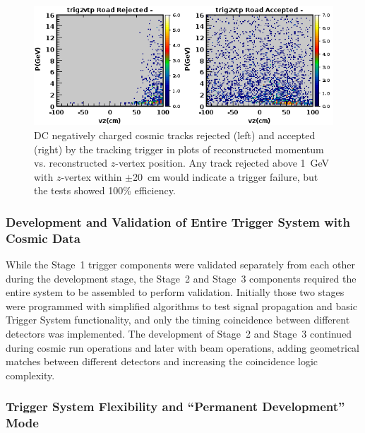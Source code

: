 \begin{figure}[!htb]
 	\centering
  	\includegraphics[width=1.0\columnwidth,keepaspectratio]{img/dc_cosmic_efficiency.png}
 	\caption{DC negatively charged cosmic tracks rejected (left) and accepted (right) by the tracking trigger
          in plots of reconstructed momentum vs. reconstructed $z$-vertex position. Any track rejected above
          1~GeV with $z$-vertex within $\pm$20~cm would indicate a trigger failure, but the tests showed 100\%
          efficiency.}
	\label{fig:dc_cosmic_efficiency}
\end{figure}

\subsubsection{Development and Validation of Entire Trigger System with Cosmic Data} 

While the Stage~1 trigger components were validated separately from each other during the development
stage, the Stage~2 and Stage~3 components required the entire system to be assembled to perform
validation. Initially those two stages were programmed with simplified algorithms to test signal propagation
and basic Trigger System functionality, and only the timing coincidence between different detectors was
implemented. The development of Stage~2 and Stage~3 continued during cosmic run operations and later with
beam operations, adding geometrical matches between different detectors and increasing the coincidence
logic complexity.

\subsubsection{Trigger System Flexibility and ``Permanent Development'' Mode}

